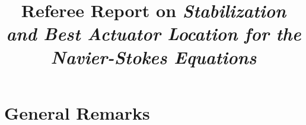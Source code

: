 \documentclass[a4paper,10pt]{article}
\title{Referee Report on \emph{Stabilization and Best Actuator Location for the Navier-Stokes Equations}}
\begin{document}
\maketitle
% 

\section{General Remarks}



\end{document}

